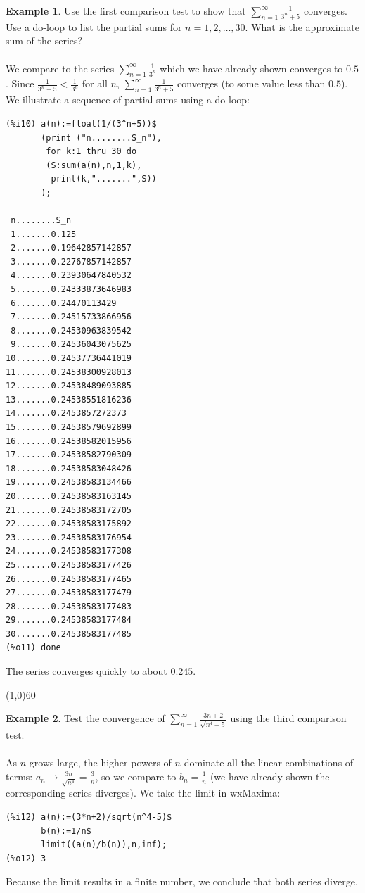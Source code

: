 \documentclass[10.5pt,twoside]{report}
\theoremstyle{definition}
\newtheorem{exmp}{Example}[section]
\begin{document}
\begin{exmp} Use the first comparison test to show that $ \sum_{n=1}^{\infty} \frac{1}{3^n+5}$ converges.  Use a do-loop to list the partial sums for $n=1,2,\dots ,30$.  What is the approximate sum of the series?\\

${}$\\

We compare to the series $ \sum_{n=1}^{\infty} \frac{1}{3^n}$ which we have already shown converges to $0.5$.  Since $\frac{1}{3^n+5} < \frac{1}{3^n}$ for all $n$, $ \sum_{n=1}^{\infty} \frac{1}{3^n+5}$ converges (to some value less than $0.5$).  We illustrate a sequence of partial sums using a do-loop:

\begin{verbatim}
(%i10) a(n):=float(1/(3^n+5))$
       (print ("n........S_n"),
        for k:1 thru 30 do
        (S:sum(a(n),n,1,k),
         print(k,".......",S))
       );
 
 n........S_n
 1.......0.125
 2.......0.19642857142857
 3.......0.22767857142857
 4.......0.23930647840532
 5.......0.24333873646983
 6.......0.24470113429
 7.......0.24515733866956
 8.......0.24530963839542
 9.......0.24536043075625
10.......0.24537736441019
11.......0.24538300928013
12.......0.24538489093885
13.......0.24538551816236
14.......0.2453857272373
15.......0.24538579692899
16.......0.24538582015956
17.......0.24538582790309
18.......0.24538583048426
19.......0.24538583134466
20.......0.24538583163145
21.......0.24538583172705
22.......0.24538583175892
23.......0.24538583176954
24.......0.24538583177308
25.......0.24538583177426
26.......0.24538583177465
27.......0.24538583177479
28.......0.24538583177483
29.......0.24538583177484
30.......0.24538583177485
(%o11) done
\end{verbatim}

The series converges quickly to about $0.245$.

\end{exmp}

\line(1,0){60}
\linethickness{0.5mm}

\begin{exmp} Test the convergence of $ \sum_{n=1}^{\infty} \frac{3n+2}{\sqrt{n^4-5}}$ using the third comparison test.\\

${}$\\

As $n$ grows large, the higher powers of $n$ dominate all the linear combinations of terms: $a_n\to \frac{3n}{\sqrt{n^4}} = \frac{3}{n}$, so we compare to $b_n=\frac{1}{n}$ (we have already shown the corresponding series diverges).  We take the limit in wxMaxima:

\begin{verbatim}
(%i12) a(n):=(3*n+2)/sqrt(n^4-5)$
       b(n):=1/n$
       limit((a(n)/b(n)),n,inf);
(%o12) 3
\end{verbatim}

Because the limit results in a finite number, we conclude that both series diverge.

\end{exmp}
\end{document}
